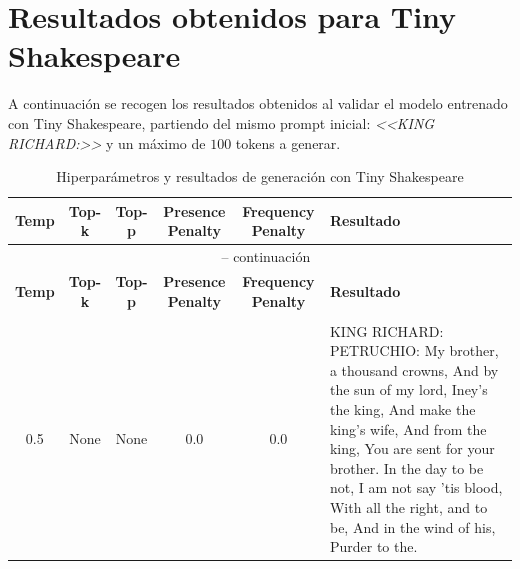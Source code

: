 \documentclass[11pt]{book}
\begin{document}
\section{Resultados obtenidos para Tiny Shakespeare} \label{sec:res-tiny}

A continuación se recogen los resultados obtenidos al validar el modelo entrenado con Tiny Shakespeare, partiendo del mismo prompt inicial: \textit{<<KING RICHARD:>>} y un máximo de $100$ tokens a generar.

\begin{longtable}{ccccc p{12cm}}
    \caption{Hiperparámetros y resultados de generación con Tiny Shakespeare}
    \label{tab:resultados_validacion_shakespeare} \\
    \toprule
    \textbf{Temp} & \textbf{Top-k} & \textbf{Top-p} &
    \textbf{Presence Penalty} & \textbf{Frequency Penalty} & \textbf{Resultado} \\
    \midrule
    \endfirsthead
    
    \multicolumn{6}{c}{{\tablename\ \thetable{} -- continuación}} \\
    \toprule
    \textbf{Temp} & \textbf{Top-k} & \textbf{Top-p} &
    \textbf{Presence Penalty} & \textbf{Frequency Penalty} & \textbf{Resultado} \\
    \midrule
    \endhead
    
    \bottomrule
    \multicolumn{6}{r}{} \\
    \endfoot
    
    \bottomrule
    \endlastfoot
    
    0.5 & None & None & 0.0 & 0.0 &
    KING RICHARD:\newline
    PETRUCHIO:\newline
    My brother, a thousand crowns,\newline
    And by the sun of my lord,\newline
    Iney’s the king,\newline
    And make the king’s wife,\newline
    And from the king,\newline
    You are sent for your brother.\newline
    In the day to be not, I am not say ’tis blood,\newline
    With all the right, and to be,\newline
    And in the wind of his,\newline
    Purder to the.\\
    

\end{longtable}
\end{document}
